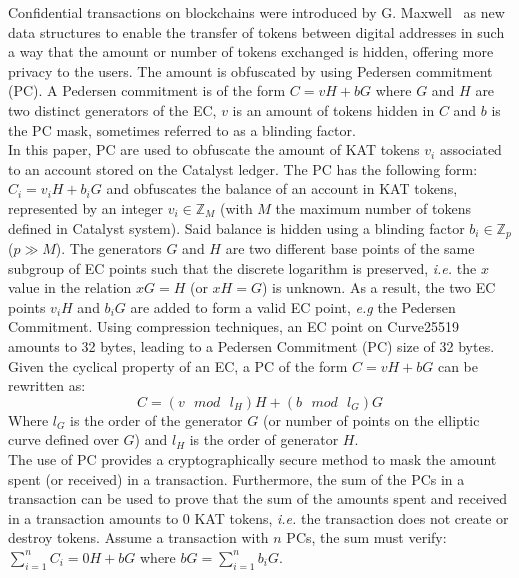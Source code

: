 Confidential transactions on blockchains were introduced by G. Maxwell~\cite{confidential} as new data structures to enable the transfer of tokens between digital addresses in such a way that the amount or number of tokens exchanged is hidden, offering more privacy to the users. The amount is obfuscated by using Pedersen commitment (PC). A Pedersen commitment is of the form $C = vH + bG$ where $G$ and $H$ are two distinct generators of the EC, $v$ is an amount of tokens hidden in $C$ and $b$ is the PC mask, sometimes referred to as a blinding factor.\\

In this paper, PC are used to obfuscate the amount of KAT tokens $v_{i}$ associated to an account stored on the Catalyst ledger. The PC has the following form: $C_{i} = v_{i}H + b_{i}G$ and obfuscates the balance of an account in KAT tokens, represented by an integer $v_{i} \in \mathbb{Z}_M$ (with $M$ the maximum number of tokens defined in Catalyst system). Said balance is hidden using a blinding factor $b_{i} \in \mathbb{Z}_p$ ($p \gg M$). The generators $G$ and $H$ are two different base points of the same subgroup of EC points such that the discrete logarithm is preserved, \textit{i.e.} the $x$ value in the relation $xG = H$ (or $xH = G$) is unknown. As a result, the two EC points $v_{i}H$ and $b_{i}G$ are added to form a valid EC point, \textit{e.g} the Pedersen Commitment. Using compression techniques, an EC point on Curve25519 amounts to 32 bytes, leading to a Pedersen Commitment (PC) size of 32 bytes.\\

Given the cyclical property of an EC, a PC of the form $C = vH + bG$ can be rewritten as:
\begin{equation}
C = (v \text{ $mod$ } l_H) H + (b \text{ $mod$ } l_G) G
\end{equation}
Where $l_G$ is the order of the generator $G$ (or number of points on the elliptic curve defined over $G$) and $l_H$ is the order of generator $H$.\\ 


The use of PC provides a cryptographically secure method to mask the amount spent (or received) in a transaction. Furthermore, the sum of the PCs in a transaction can be used to prove that the sum of the amounts spent and received in a transaction amounts to 0 KAT tokens, \textit{i.e.} the transaction does not create or destroy tokens. Assume a transaction with $n$ PCs, the sum must verify: $\sum_{i=1}^n C_i = 0H + bG$ where $bG = \sum_{i=1}^n b_iG$. \\

